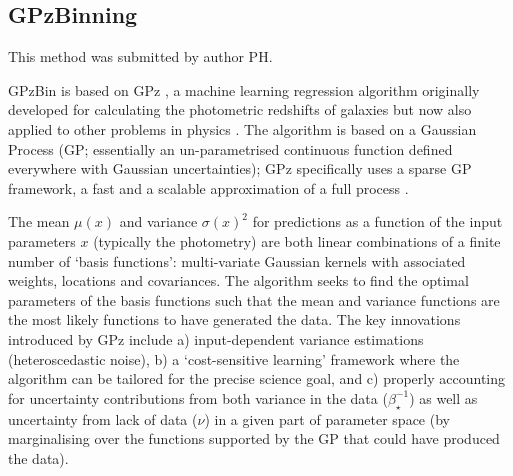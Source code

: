 \documentclass[twocolumn,twocolappendix]{aastex63}
\begin{document}
\subsection{ {\sc GPzBinning} }
This method was submitted by author PH.

GPzBin is based on GPz \citep{Almosallam2016a,Almosallam2016b}, a machine learning
regression algorithm originally developed for calculating the photometric
redshifts of galaxies \citep{Gomes2017,Duncan2018,Hatfield2020} but now also
applied to other problems in physics \citep{Peng2019,Hatfield2020}. The
algorithm is based on a Gaussian Process (GP; essentially an un-parametrised continuous
function defined everywhere with Gaussian uncertainties); GPz specifically uses 
a sparse GP framework, a fast and a scalable approximation
of a full process \citep{Rasmussen2006}.

The mean $\mu(x)$ and variance $\sigma(x)^2$ for predictions as a function of
the input parameters $x$ (typically the photometry) are both linear combinations
of a finite number of `basis functions': multi-variate Gaussian kernels with
associated weights, locations and covariances. The algorithm seeks to find the
optimal parameters of the basis functions such that the mean and variance
functions are the most likely functions to have generated the data. The key
innovations introduced by GPz include a) input-dependent variance estimations
(heteroscedastic noise), b) a `cost-sensitive learning' framework where the
algorithm can be tailored for the precise science goal, and c) properly
accounting for uncertainty contributions from both variance in the data
($\beta^{-1}_{\star}$) as well as uncertainty from lack of data ($\nu$) in a
given part of parameter space (by marginalising over the functions supported by
the GP that could have produced the data).

\end{document}
